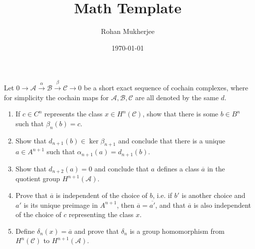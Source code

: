 \documentclass[12pt]{article}
\title{Math Template}
\date{\today}
\author{Rohan Mukherjee}
\newenvironment{theorem}{\begin{mytheorem}}{\end{mytheorem}}
\theoremstyle{definitionstyle}
\begin{document}
    \maketitle
    \begin{theorem}
        Let $0 \to \mathscr{A} \overset{\alpha}{\to} \mathscr{B} \overset{\beta}{\to} \mathscr{C} \to 0$ be a short exact sequence of cochain complexes, where for simplicity the cochain maps for $\mathscr{A}, \mathscr{B}, \mathscr{C}$ are all denoted by the same $d$. 
        \begin{enumerate}[label=(\alph*)]
            \item If $c \in C^n$ represents the class $x \in H^n(\mathscr{C})$, show that there is some $b \in B^n$ such that $\beta_n(b) = c$.
            \item Show that $d_{n+1}(b) \in \ker \beta_{n+1}$ and conclude that there is a unique $a \in A^{n+1}$ such that $\alpha_{n+1}(a) = d_{n+1}(b)$.
            \item Show that $d_{n+2}(a) = 0$ and conclude that $a$ defines a class $\overline a$ in the quotient group $H^{n+1}(\mathscr A)$.
            \item Prove that $\overline a$ is independent of the choice of $b$, i.e. if $b'$ is another choice and $a'$ is its unique preimage in $A^{n+1}$, then $\overline a = \overline{a'}$, and that $\overline a$ is also independent of the choice of $c$ representing the class $x$.
            \item Define $\delta_n(x) = \overline a$ and prove that $\delta_n$ is a group homomorphism from $H^n(\mathscr C)$ to $H^{n+1}(\mathscr A)$.
        \end{enumerate}
    \end{theorem}
\end{document}
